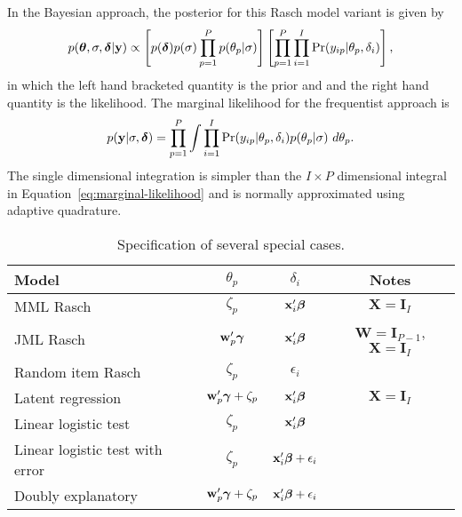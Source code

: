 \documentclass[12pt, letterpaper]{article}
\begin{document}
In the Bayesian approach, the posterior for this Rasch model variant is given by
\begin{equation}
	p(\boldsymbol{\theta}, \sigma, \boldsymbol{\delta} | \mathbf{y}) \propto
	\left [ 
		p(\boldsymbol{\delta}) 	p(\sigma)
		\prod_{p=1}^P p(\theta_p | \sigma) 
	\right ]
	\left [ 
		\prod_{p=1}^P \prod_{i=1}^I 
		\Pr ( {y_{ip}} | \theta_p, \delta_i) 
	\right ]
,\end{equation}
in which the left hand bracketed quantity is the prior and and the right hand quantity is the likelihood. The marginal likelihood for the frequentist approach is
\begin{equation}
	p(\mathbf{y} | \sigma, \boldsymbol{\delta}) =
	\prod_{p=1}^P
	\int
		\prod_{i=1}^I 
		\Pr({y_{ip}} | \theta_p, \delta_i)
		p(\theta_p | \sigma)
	~d \theta_p
.\end{equation}
The single dimensional integration is simpler than the $I \times P$ dimensional integral in Equation~\ref{eq:marginal-likelihood} and is normally approximated using adaptive quadrature.

\begin{table}
	\centering
	\begin{tabular}{lccc}
		\hline
		Model	& $\theta_p$ & $\delta_i$ & Notes \\ \hline
		MML Rasch
			& $\zeta_p$ & $\mathbf{x}_i'\boldsymbol{\beta}$ & $\mathbf{X} = \mathbf{I}_I$ \\ 
		JML Rasch
			& $\mathbf{w}_p' \boldsymbol{\gamma}$ & $\mathbf{x}_i'\boldsymbol{\beta}$ & $\mathbf{W} = \mathbf{I}_{P-1}$, 
			                                                    $\mathbf{X} = \mathbf{I}_I$ \\ 
		Random item Rasch
			& $\zeta_p$ & $\epsilon_i$ &  \\ 
		Latent regression
			& $\mathbf{w}_p' \boldsymbol{\gamma} + \zeta_p$ & $\mathbf{x}_i'\boldsymbol{\beta}$ & $\mathbf{X} = \mathbf{I}_I$ \\ 
		Linear logistic test
			& $\zeta_p$ & $\mathbf{x}_i'\boldsymbol{\beta}$ &  \\ 
		Linear logistic test with error
			& $\zeta_p$ & $\mathbf{x}_i'\boldsymbol{\beta} + \epsilon_i$ &  \\ 
		Doubly explanatory
			& $\mathbf{w}_p' \boldsymbol{\gamma} + \zeta_p$ &  $\mathbf{x}_i'\boldsymbol{\beta} + \epsilon_i$ & \\
		\hline
	\end{tabular}
	\caption{Specification of several special cases.}
	\label{tab:special-cases}
\end{table}
\end{document}

